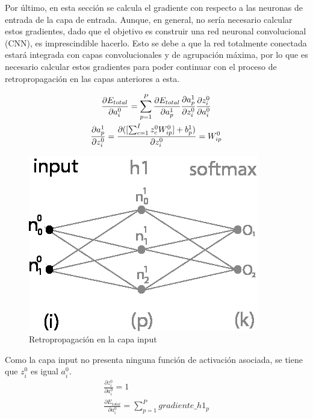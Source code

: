 Por último, en esta sección se calcula el gradiente con respecto a las neuronas de entrada de la capa de entrada. Aunque, en general, no sería necesario calcular estos gradientes, dado que el objetivo es construir una red neuronal convolucional (CNN), es imprescindible hacerlo. Esto se debe a que la red totalmente conectada estará integrada con capas convolucionales y de agrupación máxima, por lo que es necesario calcular estos gradientes para poder continuar con el proceso de retropropagación en las capas anteriores a esta.

\begin{gather}
	\frac{\partial E_{total}}{\partial a^0_i} = \sum_{p=1}^P \frac{\partial E_{total}}{\partial a^1_p}   \frac{\partial a^1_p}{\partial z^0_i}   \frac{\partial z^0_i}{\partial a^0_i} \notag \\
	\frac{\partial a^1_p }{\partial z^0_i } = \frac{\partial ([\sum_{c=1}^{I} z^0_c   W^0_{ip}] + b^1_p) }{\partial z^0_i } = W^0_{ip} \label{grad_a_2}
\end{gather}

\begin{figure}[H]
	\centering
	\includegraphics[scale=0.35]{imagenes/nn_1_capa_input.jpg}  
	\caption{Retropropagación en la capa input}
	\label{fig:nn_1_capa_input}
\end{figure}

Como la capa input no presenta ninguna función de activación asociada, se tiene que $z^0_i$ es igual $a^0_i$. \\

\begin{gather}
	\frac{\partial z^0_i }{\partial a^0_i } = 1 \\
	\frac{\partial E_{total}}{\partial a^0_i} = \sum_{p=1}^{P} gradiente\_h1_p
\end{gather}

